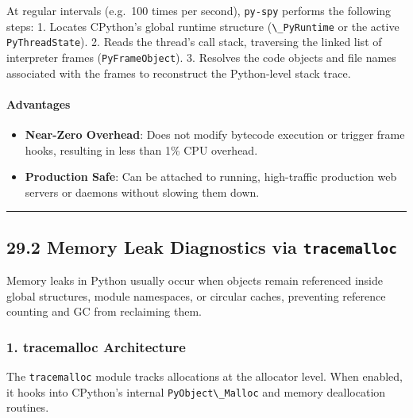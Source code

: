 At regular intervals (e.g.~100 times per second),
\passthrough{\lstinline!py-spy!} performs the following steps: 1.
Locates CPython's global runtime structure
(\passthrough{\lstinline!\_PyRuntime!} or the active
\passthrough{\lstinline!PyThreadState!}). 2. Reads the thread's call
stack, traversing the linked list of interpreter frames
(\passthrough{\lstinline!PyFrameObject!}). 3. Resolves the code objects
and file names associated with the frames to reconstruct the
Python-level stack trace.

\hypertarget{advantages-1}{%
\paragraph{Advantages}\label{advantages-1}}

\begin{itemize}
\tightlist
\item
  \textbf{Near-Zero Overhead}: Does not modify bytecode execution or
  trigger frame hooks, resulting in less than 1\% CPU overhead.
\item
  \textbf{Production Safe}: Can be attached to running, high-traffic
  production web servers or daemons without slowing them down.
\end{itemize}

\begin{center}\rule{0.5\linewidth}{0.5pt}\end{center}

\hypertarget{memory-leak-diagnostics-via-tracemalloc}{%
\subsection{\texorpdfstring{29.2 Memory Leak Diagnostics via
\texttt{tracemalloc}}{29.2 Memory Leak Diagnostics via tracemalloc}}\label{memory-leak-diagnostics-via-tracemalloc}}

Memory leaks in Python usually occur when objects remain referenced
inside global structures, module namespaces, or circular caches,
preventing reference counting and GC from reclaiming them.

\hypertarget{tracemalloc-architecture}{%
\subsubsection{1. tracemalloc
Architecture}\label{tracemalloc-architecture}}

The \passthrough{\lstinline!tracemalloc!} module tracks allocations at
the allocator level. When enabled, it hooks into CPython's internal
\passthrough{\lstinline!PyObject\_Malloc!} and memory deallocation
routines.

